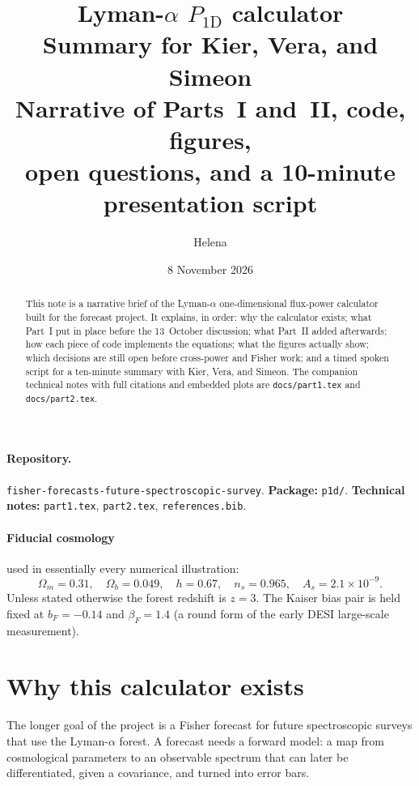\documentclass[11pt]{article}
\title{Lyman-$\alpha$ $P_{1\mathrm{D}}$ calculator\\[0.35em]
\large Summary for Kier, Vera, and Simeon\\[0.25em]
\normalsize Narrative of Parts~I and~II, code, figures,\\
open questions, and a 10-minute presentation script}
\author{Helena}
\date{8 November 2026}
\begin{document}
\maketitle

\begin{abstract}
\noindent
This note is a narrative brief of the Lyman-$\alpha$ one-dimensional flux-power calculator built for the forecast project.
It explains, in order: why the calculator exists; what Part~I put in place before the 13~October discussion; what Part~II added afterwards; how each piece of code implements the equations; what the figures actually show; which decisions are still open before cross-power and Fisher work; and a timed spoken script for a ten-minute summary with Kier, Vera, and Simeon.
The companion technical notes with full citations and embedded plots are \texttt{docs/part1.tex} and \texttt{docs/part2.tex}.
\end{abstract}

\paragraph{Repository.}
\texttt{fisher-forecasts-future-spectroscopic-survey}.
\textbf{Package:} \texttt{p1d/}.
\textbf{Technical notes:} \texttt{part1.tex}, \texttt{part2.tex}, \texttt{references.bib}.

\paragraph{Fiducial cosmology}
used in essentially every numerical illustration:
\begin{equation*}
\Omega_m=0.31,\quad
\Omega_b=0.049,\quad
h=0.67,\quad
n_s=0.965,\quad
A_s=2.1\times 10^{-9}.
\end{equation*}
Unless stated otherwise the forest redshift is $z=3$.
The Kaiser bias pair is held fixed at $b_F=-0.14$ and $\beta_F=1.4$ (a round form of the early DESI large-scale measurement).

\tableofcontents
\newpage

\section{Why this calculator exists}

The longer goal of the project is a Fisher forecast for future spectroscopic surveys that use the Lyman-$\alpha$ forest.
A forecast needs a forward model: a map from cosmological parameters to an observable spectrum that can later be differentiated, given a covariance, and turned into error bars.
\end{document}
